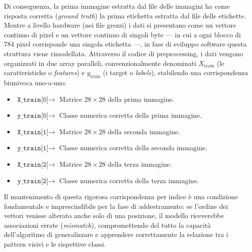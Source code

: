 \documentclass[12pt,a4paper]{article}
\begin{document}
	Di conseguenza, la prima immagine estratta dal file delle immagini ha come risposta corretta (\textit{ground truth}) la prima etichetta estratta dal file delle etichette. Mentre a livello hardware (nei file grezzi) i dati si presentano come un vettore continuo di pixel e un vettore continuo di singoli byte — in cui a ogni blocco di 784 pixel corrisponde una singola etichetta —, in fase di sviluppo software questa struttura viene rimodellata. Attraverso il codice di preprocessing, i dati vengono organizzati in due array paralleli, convenzionalmente denominati $X_{\text{train}}$ (le caratteristiche o \textit{features}) e $y_{\text{train}}$ (i target o \textit{labels}), stabilendo una corrispondenza biunivoca uno-a-uno:
	\begin{itemize}
		\item $\texttt{X\_train[0]} \rightarrow$ Matrice $28 \times 28$ della prima immagine.
		\item $\texttt{y\_train[0]} \rightarrow$ Classe numerica corretta della prima immagine.\vspace{0.2cm}
		\item $\texttt{X\_train[1]} \rightarrow$ Matrice $28 \times 28$ della seconda immagine.
		\item $\texttt{y\_train[1]} \rightarrow$ Classe numerica corretta della seconda immagine.\vspace{0.2cm}
		\item $\texttt{X\_train[2]} \rightarrow$ Matrice $28 \times 28$ della terza immagine.
		\item $\texttt{y\_train[2]} \rightarrow$ Classe numerica corretta della terza immagine.
	\end{itemize}

	Il mantenimento di questa rigorosa corrispondenza per indice è una condizione fondamentale e imprescindibile per la fase di addestramento: se l'ordine dei vettori venisse alterato anche solo di una posizione, il modello riceverebbe associazioni errate (\textit{mismatch}), compromettendo del tutto la capacità dell'algoritmo di generalizzare e apprendere correttamente la relazione tra i pattern visivi e le rispettive classi.
\end{document}
